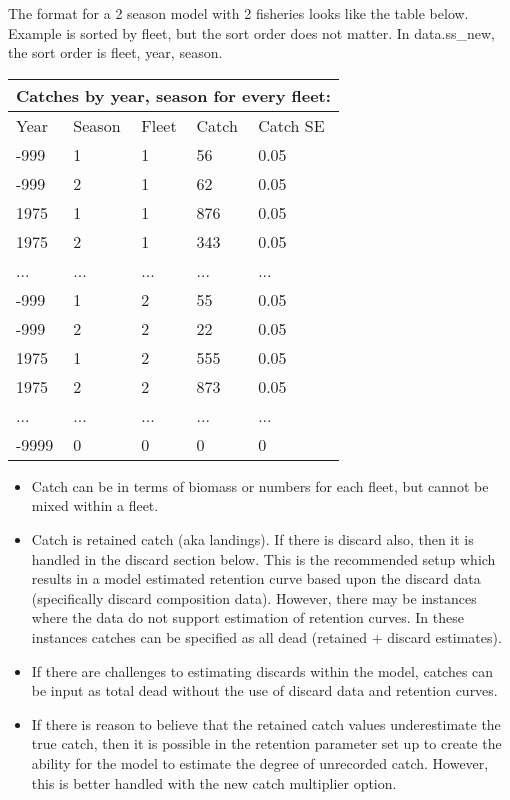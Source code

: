 The format for a 2 season model with 2 fisheries looks like the table below.  Example is sorted by fleet, but the sort order does not matter.  In data.ss\_new, the sort order is fleet, year, season.

\begin{center}
	\begin{tabular}{p{3cm} p{3cm} p{3cm} p{3cm} p{2cm}}
		\multicolumn{5}{l}{Catches by year, season for every fleet:}\\
		\hline
		Year & Season & Fleet & Catch & Catch SE \Tstrut\Bstrut\\
		\hline
		-999 & 1 & 1 & 56  & 0.05 \Tstrut\\
		-999 & 2 & 1 & 62  & 0.05 \\
		1975 & 1 & 1 & 876 & 0.05 \\
		1975 & 2 & 1 & 343 & 0.05 \\
		...  & ...   & ...   & ...   & ...  \\
		-999 & 1 & 2 & 55  & 0.05 \\
		-999 & 2 & 2 & 22  & 0.05 \\
		1975 & 1 & 2 & 555 & 0.05 \\
		1975 & 2 & 2 & 873 & 0.05 \\
		...  & ...   & ...   & ...   & ...  \\
		-9999 & 0 & 0 & 0 & 0 \Bstrut\\
		\hline
	\end{tabular}
\end{center}

\begin{itemize}
	\item Catch can be in terms of biomass or numbers for each fleet, but cannot be mixed within a fleet.
	\item Catch is retained catch (aka landings). If there is discard also, then it is handled in the discard section below.  This is the recommended setup which results in a model estimated retention curve based upon the discard data (specifically discard composition data).  However, there may be instances where the data do not support estimation of retention curves.  In these instances catches can be specified as all dead (retained + discard estimates).
	\item If there are challenges to estimating discards within the model, catches can be input as total dead without the use of discard data and retention curves.
	\item If there is reason to believe that the retained catch values underestimate the true catch, then it is possible in the retention parameter set up to create the ability for the model to estimate the degree of unrecorded catch.  However, this is better handled with the new catch multiplier option.
\end{itemize}


